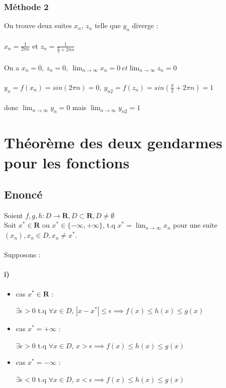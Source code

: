 \documentclass{article}
\begin{document}
\subsubsection{Méthode 2}
On trouve deux suites $x_n$, $z_n$ telle que $y_n$ diverge : \\\\
$x_n = \frac{1}{2\pi n}$ et $z_n = \frac{1}{\frac{\pi}{2} + 2\pi{n}}$ \\\\
On a $x_n = 0,\ z_n = 0,\ \lim_{n\to\infty}x_n = 0\ et \lim_{n\to\infty}z_n = 0$ \\\\
$y_n = f(x_n) = sin(2\pi n) = 0,\ y_{n2} = f(z_n) = sin(\frac{\pi}{2} + 2\pi n) = 1$ \\\\
donc $\lim_{n\to\infty}y_n = 0$ mais $\lim_{n\to\infty}y_{n2} = 1$

\newpage
\section{Théorème des deux gendarmes pour les fonctions}

\subsection{Enoncé}

Soient $ f, g, h: D \to \mathbf{R}, D \subset \mathbf{R}, D \neq \emptyset $\\
Soit $ x^* \in \mathbf{R} $ ou $ x^* \in \{-\infty, +\infty\}$, t.q $ x^* = \lim_{n\to\infty} x_n $ pour une suite $ (x_n), x_n \in D, x_n \neq x^* $.\\\\
Supposons :

\paragraph{i)}

\begin{itemize}
    \item cas $ x^* \in \mathbf{R} $ :

$ \exists \epsilon > 0 $ t.q $ \forall x \in D $, $ |x-x^*| \leq \epsilon \implies f(x) \leq h(x) \leq g(x) $

\item cas $ x^* = +\infty $ :

$ \exists \epsilon > 0 $ t.q $ \forall x \in D $, $ x > \epsilon \implies f(x) \leq h(x) \leq g(x) $

\item cas $ x^* = -\infty $ :

$ \exists \epsilon < 0 $ t.q $ \forall x \in D $, $ x < \epsilon \implies f(x) \leq h(x) \leq g(x) $

\end{itemize}
\end{document}
